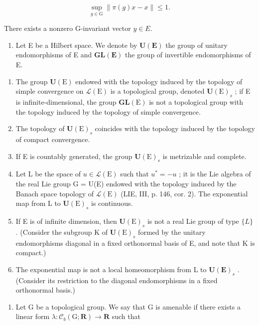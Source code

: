 \[
\sup _ {g \in \mathrm{G}} \| \pi (g) x - x \| \leqslant 1.
\]

There exists a nonzero G-invariant vector \(y \in E\).

\begin{enumerate}
\def\labelenumi{\arabic{enumi})}
\setcounter{enumi}{2}
\tightlist
\item
  Let E be a Hilbert space. We denote by \(\mathbf{U}(\mathbf{E})\) the group of unitary endomorphisms of E and \(\mathbf{GL}(\mathbf{E})\) the group of invertible endomorphisms of E.
\end{enumerate}

\begin{enumerate}
\def\labelenumi{\alph{enumi})}
\item
  The group \(\mathbf{U}(\mathrm{E})\) endowed with the topology induced by the topology of simple convergence on \(\mathcal{L}(\mathrm{E})\) is a topological group, denoted \(\mathbf{U}(\mathrm{E})_{s}\) ; if E is infinite-dimensional, the group \(\mathbf{GL}(\mathrm{E})\) is not a topological group with the topology induced by the topology of simple convergence.
\item
  The topology of \(\mathbf{U}(\mathrm{E})_{s}\) coincides with the topology induced by the topology of compact convergence.
\item
  If E is countably generated, the group \(\mathbf{U}(\mathrm{E})_{s}\) is metrizable and complete.
\item
  Let L be the space of \(u \in \mathcal{L}(\mathrm{E})\) such that \(u^{*} = -u\) ; it is the Lie algebra of the real Lie group G = U(E) endowed with the topology induced by the Banach space topology of \(\mathcal{L}(\mathrm{E})\) (LIE, III, p. 146, cor. 2). The exponential map from L to \(\mathbf{U}(\mathrm{E})_s\) is continuous.
\item
  If E is of infinite dimension, then \(\mathbf{U}(\mathrm{E})_{s}\) is not a real Lie group of type \(\{L\}\) . (Consider the subgroup K of \(\mathbf{U}(\mathrm{E})_{s}\) formed by the unitary endomorphisms diagonal in a fixed orthonormal basis of E, and note that K is compact.)
\item
  The exponential map is not a local homeomorphism from L to \(\mathbf{U}(\mathbf{E})_{s}\) . (Consider its restriction to the diagonal endomorphisms in a fixed orthonormal basis.)
\end{enumerate}

\begin{enumerate}
\def\labelenumi{\arabic{enumi})}
\setcounter{enumi}{3}
\tightlist
\item
  Let G be a topological group. We say that G is amenable if there exists a linear form \(\lambda\colon\mathcal{C}_{b}(\mathrm{G};\mathbf{R})\to\mathbf{R}\) such that
\end{enumerate}


